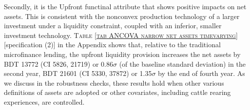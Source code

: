	Secondly, it is the \textsf{Upfront} functinal attribute that shows positive impacts on net assets. %
	This is consistent with the nonconvex production technology of a larger investment under a liquidity constraint, coupled with an inferior, smaller investment technology. \textsc{\normalsize Table \ref{tab ANCOVA narrow net assets timevarying}} [specification (2)] in the Appendix shows that, relative to the traditional microfinance lending, the upfront liquidity provision increases the net assets by BDT 
	13772 
	(CI 5826, 21719) or 0.86$\sigma$ (of the baseline standard deviation) in the second year, 
	BDT 21601 
	(CI 5330, 37872) or 1.35$\sigma$ by the end of fourth year. 
	As we discuss in the robustness checks, these results hold when other various definitions of assets are adopted or other covariates, including cattle rearing experiences, are controlled.

